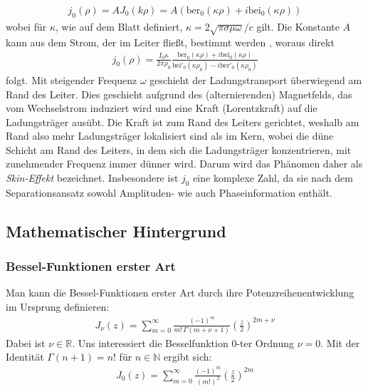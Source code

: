 \documentclass[10pt,a4paper]{article}
\begin{document}
\begin{align}
	j_0(\rho)=A J_0(k \rho) = A(\mathrm{ber}_0(\kappa \rho)+i\mathrm{bei}_0(\kappa \rho))
\end{align}
wobei für $\kappa$, wie auf dem Blatt definiert, $\kappa = 2 \sqrt{\pi \sigma \mu \omega}/c$ gilt.
Die Konstante $A$ kann aus dem Strom, der im Leiter fließt, bestimmt werden \cite{kazimierczuk}, woraus direkt
\begin{align}
	j_0(\rho) = \frac{I_0 \kappa}{2\pi\rho_0}\frac{\mathrm{ber}_0(\kappa\rho)+i \mathrm{bei}_0(\kappa\rho)}{\mathrm{bei}'_0(\kappa\rho_0)-i\mathrm{ber}'_0(\kappa\rho_0)}
\label{eq:stromdichte}
\end{align}
folgt. Mit steigender Frequenz $\omega$ geschieht der Ladungstransport überwiegend am Rand des Leiter. Dies geschieht aufgrund des (alternierenden) Magnetfelds, das vom Wechselstrom induziert wird und eine Kraft (Lorentzkraft) auf die Ladungsträger ausübt. Die Kraft ist zum Rand des Leiters gerichtet, weshalb am Rand also mehr Ladungsträger lokalisiert sind als im Kern, wobei die düne Schicht am Rand des Leiters, in dem sich die Ladungsträger konzentrieren, mit zunehmender Frequenz immer dünner wird. Darum wird das Phänomen daher als \emph{Skin-Effekt} bezeichnet. Insbesondere ist $j_0$ eine komplexe Zahl, da sie nach dem Separationsansatz sowohl Amplituden- wie auch Phaseinformation enthält.

\subsection{Mathematischer Hintergrund}

\subsubsection{Bessel-Funktionen erster Art}

Man kann die Bessel-Funktionen erster Art durch ihre Potenzreihenentwicklung im Ursprung definieren:
\begin{align}
	J_\nu(z) = \sum^{\infty}_{m=0} \frac{\left( -1 \right)^m}{m! \, \Gamma(m + \nu + 1)} \left(\frac{z}{2}\right)^{2m+\nu}
\end{align}
Dabei ist $\nu \in \mathbb{R}$. Uns interessiert die Besselfunktion 0-ter Ordnung $\nu = 0$.
Mit der Identität $\Gamma(n+1) = n!$ für $n \in \mathbb{N}$ ergibt sich:
\begin{align}
	\label{eq:bessel0}
	J_0(z) = \sum^{\infty}_{m=0} \frac{\left( -1 \right)^m}{\left( m! \right)^2} \left( \frac{z}{2} \right)^{2m}
\end{align}
\end{document}

